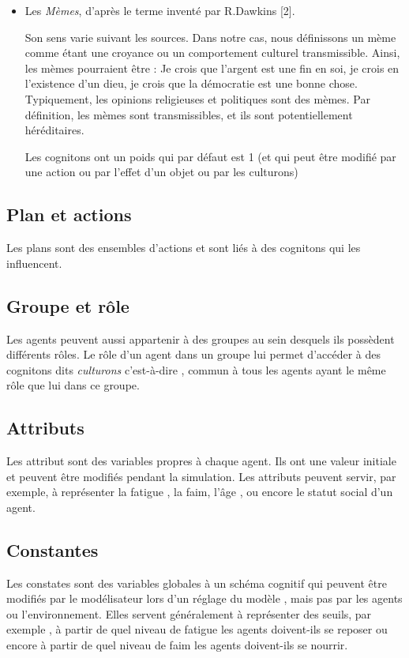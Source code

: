 \documentclass[a4paper,oneside,12 pt]{article}
\begin{document}
\begin{itemize}
\item 	Les \textit{Mèmes}, d'après le terme inventé par R.Dawkins [2].

 Son sens varie suivant les sources. Dans notre cas, nous définissons un mème comme étant une croyance ou un comportement culturel transmissible. Ainsi, les mèmes pourraient être : Je crois que l'argent est une fin en soi, je crois en l'existence d'un dieu, je crois que la démocratie est une bonne chose. Typiquement, les opinions religieuses et politiques sont des mèmes. Par définition, les mèmes sont transmissibles, et ils sont potentiellement héréditaires.
	
Les cognitons ont un poids qui par défaut est 1 (et qui peut être modifié par une action ou  par l'effet d'un objet ou par les culturons)
\end{itemize}

\subsection{Plan et actions}
Les plans sont des ensembles d'actions et sont liés à des cognitons qui les influencent.

\subsection{Groupe et rôle}
Les agents peuvent aussi appartenir à des groupes au sein desquels ils possèdent différents rôles. Le rôle d'un agent dans un groupe lui permet d'accéder à des cognitons dits \textit{ culturons} c'est-à-dire , commun à tous les agents ayant le même rôle que lui dans ce groupe. 

\subsection{Attributs}
Les attribut sont des variables propres à chaque agent. Ils ont une valeur initiale et peuvent être modifiés pendant la simulation. Les attributs peuvent servir, par exemple, à représenter la fatigue , la faim, l'âge , ou encore le statut social d'un agent.

\subsection{Constantes}
Les constates sont des variables globales à un schéma cognitif qui peuvent être modifiés par le modélisateur lors d'un réglage du modèle , mais pas par les agents ou l'environnement. Elles servent généralement à représenter des seuils, par exemple , à partir de quel niveau de fatigue les agents doivent-ils se reposer ou encore à partir de quel niveau de faim les agents doivent-ils se nourrir. 
\end{document}
